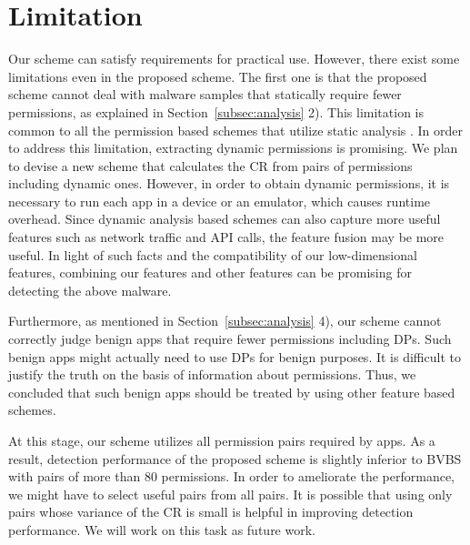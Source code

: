 \documentclass{ieeeaccess}
\begin{document}
\section{Limitation} \label{sec:limitation}
Our scheme can satisfy requirements for practical use.
However, there exist some limitations even in the proposed scheme.
The first one is that the proposed scheme cannot deal with malware samples that statically require fewer permissions, as explained in Section~\ref{subsec:analysis} 2).
This limitation is common to all the permission based schemes that utilize static analysis \cite{li2018significant, liang2014permission, liu2014two, arora2019permpair}.
In order to address this limitation, extracting dynamic permissions \cite{mahindru2017dynamic} is promising.
We plan to devise a new scheme that calculates the CR from pairs of permissions including dynamic ones.
However, in order to obtain dynamic permissions, it is necessary to run each app in a device or an emulator, which causes runtime overhead.
Since dynamic analysis based schemes can also capture more useful features such as network traffic and API calls, the feature fusion may be more useful.
In light of such facts and the compatibility of our low-dimensional features, combining our features and other features can be promising for detecting the above malware.

Furthermore, as mentioned in Section~\ref{subsec:analysis} 4), our scheme cannot correctly judge benign apps that require fewer permissions including DPs.
Such benign apps might actually need to use DPs for benign purposes.
It is difficult to justify the truth on the basis of information about permissions.
Thus, we concluded that such benign apps should be treated by using other feature based schemes.

At this stage, our scheme utilizes all permission pairs required by apps.
As a result, detection performance of the proposed scheme is slightly inferior to BVBS with pairs of more than 80 permissions.
In order to ameliorate the performance, we might have to select useful pairs from all pairs.
It is possible that using only pairs whose variance of the CR is small is helpful in improving detection performance.
We will work on this task as future work.
\end{document}
